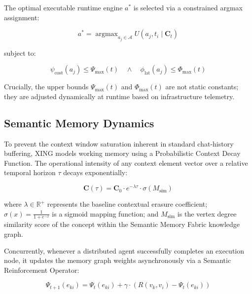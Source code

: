 \documentclass[conference]{IEEEtran}
\newcommand{\R}{\mathbb{R}}
\newcommand{\argmax}{\operatorname{argmax}}
\begin{document}
The optimal executable runtime engine $a^*$ is selected via a constrained argmax assignment:

\begin{equation}
    a^* = \argmax_{a_j \in \mathcal{A}} U(a_j, t_i \mid \mathbf{C}_t)
    \label{eq:optimal_selection}
\end{equation}

subject to:

\begin{equation}
    \psi_{\mathrm{cost}}(a_j) \leq \Psi_{\max}(t) \quad \land \quad \phi_{\mathrm{lat}}(a_j) \leq \Phi_{\max}(t)
    \label{eq:constraints}
\end{equation}

Crucially, the upper bounds $\Psi_{\max}(t)$ and $\Phi_{\max}(t)$ are not static constants; they are adjusted dynamically at runtime based on infrastructure telemetry.

\subsection{Semantic Memory Dynamics}
\label{sec:memory_dynamics}

To prevent the context window saturation inherent in standard chat-history buffering, XING models working memory using a Probabilistic Context Decay Function. The operational intensity of any context element vector over a relative temporal horizon $\tau$ decays exponentially:

\begin{equation}
    \mathbf{C}(\tau) = \mathbf{C}_0 \cdot e^{-\lambda \tau} \cdot \sigma(M_{\mathrm{sim}})
    \label{eq:context_decay}
\end{equation}

where $\lambda \in \R^+$ represents the baseline contextual erasure coefficient; $\sigma(x) = \frac{1}{1 + e^{-x}}$ is a sigmoid mapping function; and $M_{\mathrm{sim}}$ is the vertex degree similarity score of the concept within the Semantic Memory Fabric knowledge graph.

Concurrently, whenever a distributed agent successfully completes an execution node, it updates the memory graph weights asynchronously via a Semantic Reinforcement Operator:

\begin{equation}
    \Psi_{t+1}(e_{ki}) = \Psi_t(e_{ki}) + \gamma \cdot (R(v_k, v_i) - \Psi_t(e_{ki}))
    \label{eq:reinforcement}
\end{equation}
\end{document}
